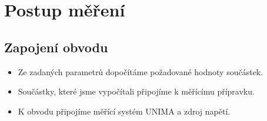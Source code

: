 \section*{Postup měření}
  \subsection*{Zapojení obvodu}
    \begin{itemize}
      \item
      	Ze zadaných parametrů dopočítáme požadované hodnoty součástek.
      \item
      	Součástky, které jsme vypočítali připojíme k měřícímu přípravku.
      \item
        K obvodu připojíme měřící systém UNIMA a zdroj napětí. 	
	\end{itemize}

		
 
